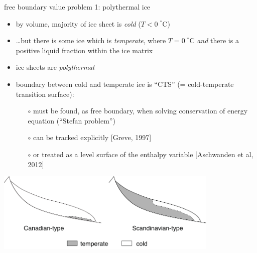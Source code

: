 \begin{frame}{free boundary value problem 1: polythermal ice}

\small
\begin{itemize}
\item by volume, majority of ice sheet is \emph{cold} ($T < 0\phantom{|}^\circ\text{C}$)
\item \dots but there is some ice which is \emph{temperate}, where $T = 0\phantom{|}^\circ\text{C}$ \emph{and} there is a positive liquid fraction within the ice matrix
\item ice sheets are \emph{polythermal}
\item boundary between cold and temperate ice is ``CTS'' (= cold-temperate transition surface):
  \begin{itemize}
  \item[$\circ$] must be found, as free boundary, when solving conservation of energy equation (``Stefan problem'')
  \item[$\circ$] can be tracked explicitly [Greve, 1997]
  \item[$\circ$] or treated as a level surface of the enthalpy variable [Aschwanden et al, 2012]
  \end{itemize}
\end{itemize}

\begin{center}
\includegraphics[width=0.8\textwidth]{photos/polythermal_types}
\end{center}
\end{frame}


